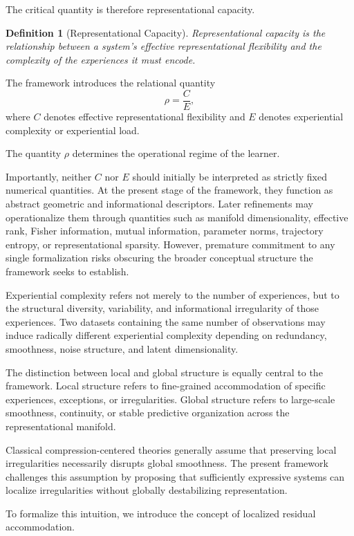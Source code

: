\documentclass[12pt,a4paper]{article}
\newtheorem{definition}{Definition}[section]
\begin{document}
The critical quantity is therefore representational capacity.

\begin{definition}[Representational Capacity]
Representational capacity is the relationship between a system's effective representational flexibility and the complexity of the experiences it must encode.
\end{definition}

The framework introduces the relational quantity
\[
\rho = \frac{C}{E},
\]
where \(C\) denotes effective representational flexibility and \(E\) denotes experiential complexity or experiential load.

The quantity \(\rho\) determines the operational regime of the learner.

Importantly, neither \(C\) nor \(E\) should initially be interpreted as strictly fixed numerical quantities. At the present stage of the framework, they function as abstract geometric and informational descriptors. Later refinements may operationalize them through quantities such as manifold dimensionality, effective rank, Fisher information, mutual information, parameter norms, trajectory entropy, or representational sparsity. However, premature commitment to any single formalization risks obscuring the broader conceptual structure the framework seeks to establish.

Experiential complexity refers not merely to the number of experiences, but to the structural diversity, variability, and informational irregularity of those experiences. Two datasets containing the same number of observations may induce radically different experiential complexity depending on redundancy, smoothness, noise structure, and latent dimensionality.

The distinction between local and global structure is equally central to the framework. Local structure refers to fine-grained accommodation of specific experiences, exceptions, or irregularities. Global structure refers to large-scale smoothness, continuity, or stable predictive organization across the representational manifold.

Classical compression-centered theories generally assume that preserving local irregularities necessarily disrupts global smoothness. The present framework challenges this assumption by proposing that sufficiently expressive systems can localize irregularities without globally destabilizing representation.

To formalize this intuition, we introduce the concept of localized residual accommodation.
\end{document}
